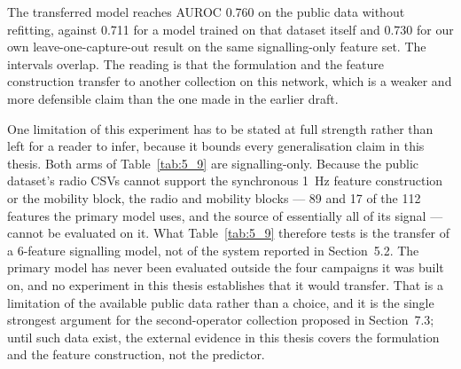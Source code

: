 The transferred model reaches AUROC 0.760 on the public data without refitting, against 0.711 for a model trained on that dataset itself and 0.730 for our own leave-one-capture-out result on the same signalling-only feature set. The intervals overlap. The reading is that the formulation and the feature construction transfer to another collection on this network, which is a weaker and more defensible claim than the one made in the earlier draft.

One limitation of this experiment has to be stated at full strength rather than left for a reader to infer, because it bounds every generalisation claim in this thesis. Both arms of Table~\ref{tab:5_9} are signalling-only. Because the public dataset's radio CSVs cannot support the synchronous 1~Hz feature construction or the mobility block, the radio and mobility blocks --- 89 and 17 of the 112 features the primary model uses, and the source of essentially all of its signal --- cannot be evaluated on it. What Table~\ref{tab:5_9} therefore tests is the transfer of a 6-feature signalling model, not of the system reported in Section~5.2. The primary model has never been evaluated outside the four campaigns it was built on, and no experiment in this thesis establishes that it would transfer. That is a limitation of the available public data rather than a choice, and it is the single strongest argument for the second-operator collection proposed in Section~7.3; until such data exist, the external evidence in this thesis covers the formulation and the feature construction, not the predictor.


\begin{table}[htbp]
\centering
\caption{Transfer between our campaigns and a same-institution public dataset on the same network \cite{ref38}, both built from L3 signalling alone.}
\label{tab:5_9}
\vspace{0.4em}
\singlespacing
\footnotesize
{}
\end{table}


